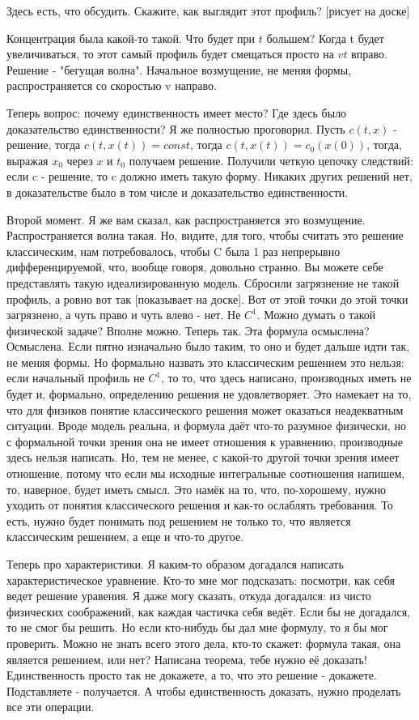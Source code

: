 Здесь есть, что обсудить. Скажите, как выглядит этот профиль? [рисует на доске]

Концентрация была какой-то такой. Что будет при $t$ большем? Когда t будет увеличиваться, то этот самый профиль будет смещаться просто на $vt$ вправо. Решение - "бегущая волна". Начальное возмущение, не меняя формы, распространяется со скоростью v направо.

Теперь вопрос: почему единственность имеет место? Где здесь было доказательство единственности? Я же полностью проговорил. Пусть $c(t,x)$ - решение, тогда $c(t,x(t)) = const$, тогда $c(t,x(t)) = c_0(x(0))$, тогда, выражая $x_0$ через $x$ и $t_0$ получаем решение. Получили четкую цепочку следствий: если c - решение, то c должно иметь такую форму. Никаких других решений нет, в доказательстве было в том числе и доказательство единственности.

Второй момент. Я же вам сказал, как распространяется это возмущение. Распространяется волна такая. Но, видите, для того, чтобы считать это решение классическим, нам потребовалось, чтобы C была 1 раз непрерывно дифференцируемой, что, вообще говоря, довольно странно. Вы можете себе представлять такую идеализированную модель. Сбросили загрязнение не такой профиль, а ровно вот так [показывает на доске]. Вот от этой точки до этой точки загрязнено, а чуть право и чуть влево - нет. Не $C^1$. Можно думать о такой физической задаче? Вполне можно. Теперь так. Эта формула осмыслена? Осмыслена. Если пятно изначально было таким, то оно и будет дальше идти так, не меняя формы. Но формально назвать это классическим решением это нельзя: если начальный профиль не $C^1$, то то, что здесь написано, производных иметь не будет и, формально, определению решения не удовлетворяет. Это намекает на то, что для физиков понятие классического решения может оказаться неадекватным ситуации. Вроде модель реальна, и формула даёт что-то разумное физически, но с формальной точки зрения она не имеет отношения к уравнению, производные здесь нельзя написать. Но, тем не менее, с какой-то другой точки зрения имеет отношение, потому что если мы исходные интегральные соотношения напишем, то, наверное, будет иметь смысл. Это намёк на то, что, по-хорошему, нужно уходить от понятия классического решения и как-то ослаблять требования. То есть, нужно будет понимать под решением не только то, что является классическим решением, а еще и что-то другое.

Теперь про характеристики. Я каким-то образом догадался написать характеристическое уравнение. Кто-то мне мог подсказать: посмотри, как себя ведет решение уравения. Я даже могу сказать, откуда догадался: из чисто физических соображений, как каждая частичка себя ведёт. Если бы не догадался, то не смог бы решить. Но если кто-нибудь бы дал мне формулу, то я бы мог проверить. Можно не знать всего этого дела, кто-то скажет: формула такая, она является решением, или нет? Написана теорема, тебе нужно её доказать! Единственность просто так не докажете, а то, что это решение - докажете. Подставляете - получается. А чтобы единственность доказать, нужно проделать все эти операции.


